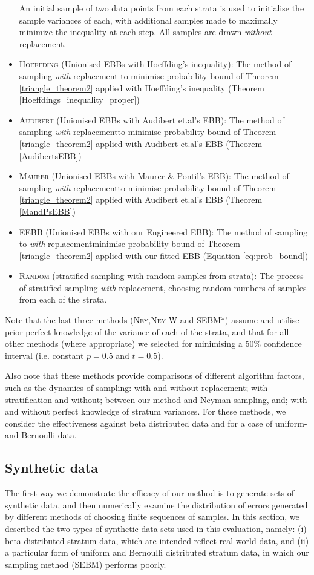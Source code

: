 \begin{itemize}
An initial sample of two data points from each strata is used to initialise the sample variances of each, with additional samples made to maximally minimize the inequality at each step. All samples are drawn \textit{without} replacement.
\item \textsc{Hoeffding} (Unionised EBBs with Hoeffding's inequality): The method of sampling \textit{with} replacement to minimise probability bound of Theorem \ref{triangle_theorem2} applied with Hoeffding's inequality (Theorem \ref{Hoeffdings_inequality_proper})
\item \textsc{Audibert} (Unionised EBBs with Audibert et.al's EBB): The method of sampling \textit{with} replacementto minimise probability bound of Theorem \ref{triangle_theorem2} applied with Audibert et.al's EBB (Theorem \ref{AudibertsEBB})
\item \textsc{Maurer} (Unionised EBBs with Maurer \& Pontil's EBB): The method of sampling \textit{with} replacementto minimise probability bound of Theorem \ref{triangle_theorem2} applied with Audibert et.al's EBB (Theorem \ref{MandPsEBB})
\item \textsc{EEBB} (Unionised EBBs with our Engineered EBB): The method of sampling to \textit{with} replacementminimise probability bound of Theorem \ref{triangle_theorem2} applied with our fitted EBB (Equation \ref{eq:prob_bound})
\item \textsc{Random} (stratified sampling with random samples from strata): The process of stratified sampling \textit{with} replacement, choosing random numbers of samples from each of the strata.
\end{itemize}
Note that the last three methods (\textsc{Ney},\textsc{Ney-W} and SEBM*) assume and utilise prior perfect knowledge of the variance of each of the strata, and that for all other methods (where appropriate) we selected for minimising a 50\% confidence interval (i.e. constant $p=0.5$ and $t=0.5$).

Also note that these methods provide comparisons of different algorithm factors, such as the dynamics of sampling: with and without replacement; with stratification and without; between our method and Neyman sampling, and; with and without perfect knowledge of stratum variances. 
For these methods, we consider the effectiveness against beta distributed data and for a case of uniform-and-Bernoulli data.

\subsection{Synthetic data}
\label{ssec:SyntheticDists}
The first way we demonstrate the efficacy of our method is to generate sets of synthetic data, and then numerically examine the distribution of errors generated by different methods of choosing finite sequences of samples.
In this section, we described the two types of synthetic data sets used in this evaluation, namely: 
(i) beta distributed stratum data, which are intended reflect real-world data, and 
(ii) a particular form of uniform and Bernoulli distributed stratum data, in which our sampling method (SEBM) performs poorly.


